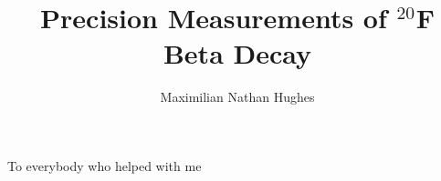 \documentclass{msuphddissertation}
\author{Maximilian Nathan Hughes} %
\title{Precision Measurements of $^{20}$F Beta Decay} %
\begin{document}
\maketitlepage %


\begin{abstract}
\end{abstract}








\begin{acknowledgment}
To everybody who helped with me 
\end{acknowledgment}
\end{document}
